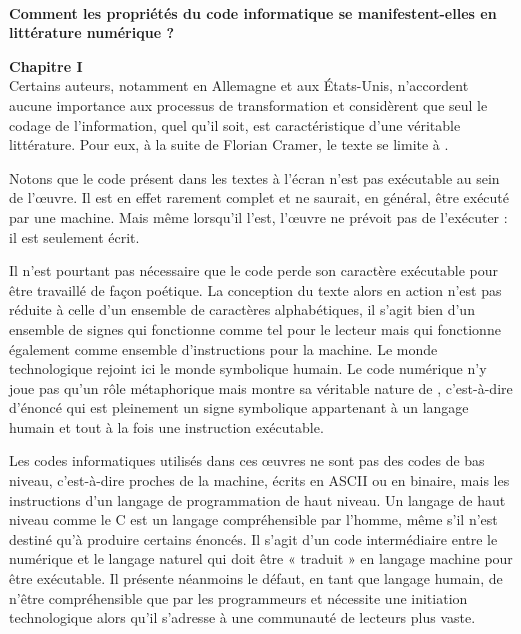 \documentclass[final, a4paper, 11pt]{article}
\begin{document}
~\\[1pt]

{

\centering

\textbf{Comment les propriétés du code informatique se manifestent-elles en littérature numérique ?  \\[.3cm]}

}

\noindent \textbf{Chapitre I\\[2mm]}
\indent Certains auteurs, notamment en Allemagne et aux États-Unis, n'accordent aucune importance aux processus de transformation et considèrent que seul le codage de l'information, quel qu'il soit, est caractéristique d'une véritable littérature. Pour eux, à la suite de Florian Cramer, le texte se limite à .

Notons que le code présent dans les textes à l'écran n'est pas exécutable au sein de l'œuvre. Il est en effet rarement complet et ne saurait, en général, être exécuté par une machine. Mais même lorsqu'il l'est, l'œuvre ne prévoit pas de l'exécuter : il est seulement écrit.

Il n'est pourtant pas nécessaire que le code perde son caractère exécutable pour être travaillé de façon poétique. La conception du texte alors en action n'est pas réduite à celle d'un ensemble de caractères alphabétiques, il s'agit bien d'un ensemble de signes qui fonctionne comme tel pour le lecteur mais qui fonctionne également comme ensemble d'instructions pour la machine. Le monde technologique rejoint ici le monde symbolique humain. Le code numérique n'y joue pas qu'un rôle métaphorique mais montre sa véritable nature de , c'est-à-dire d'énoncé qui est pleinement un signe symbolique appartenant à un langage humain et tout à la fois une instruction exécutable.

Les codes informatiques utilisés dans ces œuvres ne sont pas des codes de bas niveau, c'est-à-dire proches de la machine, écrits en ASCII ou en binaire, mais les instructions d'un langage de programmation de haut niveau. Un langage de haut niveau comme le C est un langage compréhensible par l'homme, même s'il n'est destiné qu'à produire certains énoncés. Il s'agit d'un code intermédiaire entre le numérique et le langage naturel qui doit être « traduit » en langage machine pour être exécutable. Il présente néanmoins le défaut, en tant que langage humain, de n'être compréhensible que par les programmeurs et nécessite une initiation technologique alors qu'il s'adresse à une communauté de lecteurs plus vaste. 
\end{document}
